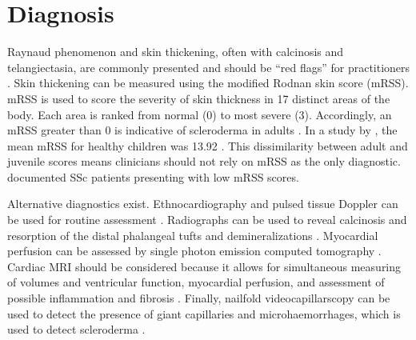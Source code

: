 \section{Diagnosis}
\label{diagnosis}

Raynaud phenomenon and skin thickening, often with calcinosis and
telangiectasia, are commonly presented and should be ``red flags'' for
practitioners \citep{redflags,abbasi}. Skin thickening can be measured using
the modified Rodnan skin score (mRSS). mRSS is used to score the severity of
skin thickness in 17 distinct areas of the body. Each area is ranked from
normal (0) to most severe (3). Accordingly, an mRSS greater than 0 is
indicative of scleroderma in adults \citep{eurostar}. In a study by
\citeauthor{foeldvari}, the mean mRSS for healthy children was 13.92
\citep{foeldvari}. This dissimilarity between adult and juvenile scores means
clinicians should not rely on mRSS as the only diagnostic.
\citeauthor{hanitsch} documented SSc patients presenting with low mRSS scores.

Alternative diagnostics exist. Ethnocardiography and pulsed tissue Doppler can
be used for routine assessment \citep{allanore}.  Radiographs can be used to
reveal calcinosis and resorption of the distal phalangeal tufts and
demineralizations \citep{overviewSSc}. Myocardial perfusion can be assessed by
single photon emission computed tomography \citep{allanore,mele}. Cardiac MRI
should be considered because it allows for simultaneous measuring of volumes
and ventricular function, myocardial perfusion, and assessment of possible
inflammation and fibrosis \citep{allanore}. Finally, nailfold
videocapillarscopy can be used to detect the presence of giant capillaries and
microhaemorrhages, which is used to detect scleroderma \citep{cutulo}.


